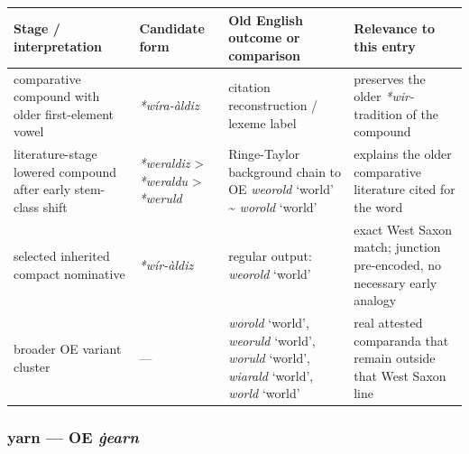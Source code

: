 \documentclass[
  british,
  a4paper,
]{article}
\newcounter{none} %
\providecommand{\Recon}[1]{\emph{*#1}}
\begin{document}
{\def\LTcaptype{none} %
\begin{longtable}[]{@{}
  >{\raggedright\arraybackslash}p{}
  >{\raggedright\arraybackslash}p{}
  >{\raggedright\arraybackslash}p{}
  >{\raggedright\arraybackslash}p{}@{}}
\toprule\noalign{}
\begin{minipage}[b]{\linewidth}\raggedright
Stage / interpretation
\end{minipage} & \begin{minipage}[b]{\linewidth}\raggedright
Candidate form
\end{minipage} & \begin{minipage}[b]{\linewidth}\raggedright
Old English outcome or comparison
\end{minipage} & \begin{minipage}[b]{\linewidth}\raggedright
Relevance to this entry
\end{minipage} \\
\midrule\noalign{}
\endhead
\bottomrule\noalign{}
\endlastfoot
comparative compound with older first-element vowel &
{\emph{*wíra-àldiz}} & citation reconstruction / lexeme label &
preserves the older \emph{*wir-} tradition of the compound \\
literature-stage lowered compound after early stem-class shift &
\Recon{weraldiz} \textgreater{} \Recon{weraldu} \textgreater{}
\Recon{weruld} & Ringe-Taylor background chain to OE {\emph{weorold}}
`world' \textasciitilde{} {\emph{worold}} `world' & explains the older
comparative literature cited for the word \\
selected inherited compact nominative & {\emph{*wír-àldiz}} & regular
output: {\emph{weorold}} `world' & exact West Saxon match; junction
pre-encoded, no necessary early analogy \\
broader OE variant cluster & --- & {\emph{worold}} `world',
{\emph{weoruld}} `world', {\emph{woruld}} `world', {\emph{wiarald}}
`world', {\emph{world}} `world' & real attested comparanda that remain
outside that West Saxon line \\
\end{longtable}
}

\subsubsection{\texorpdfstring{yarn --- OE
\emph{ġearn}}{yarn --- OE ġearn}}\label{yarn-oe-ux121earn}
\end{document}
